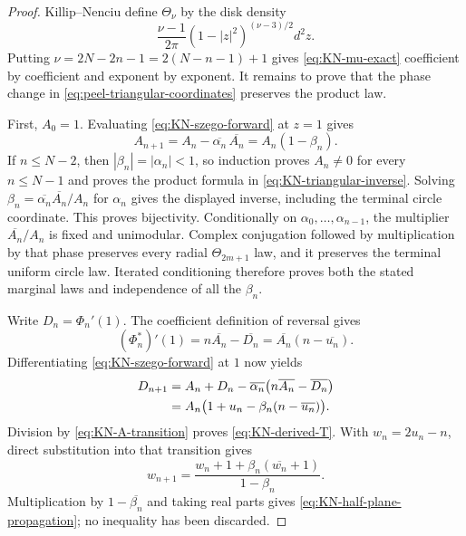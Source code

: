 \begin{proof}
Killip--Nenciu define $\Theta_\nu$ by the disk density
\begin{equation}
 \frac{\nu-1}{2\pi}(1-|z|^2)^{(\nu-3)/2}d^2z.
\end{equation}
Putting $\nu=2N-2n-1=2(N-n-1)+1$ gives \eqref{eq:KN-mu-exact}
coefficient by coefficient and exponent by exponent.  It remains to prove that the phase
change in \eqref{eq:peel-triangular-coordinates} preserves the product law.

First, $A_0=1$.  Evaluating \eqref{eq:KN-szego-forward} at $z=1$ gives
\begin{equation}
 A_{n+1}=A_n-\overline{\alpha_n}\,\overline{A_n}
 =A_n(1-\beta_n).
 \label{eq:KN-A-transition}
\end{equation}
If $n\leq N-2$, then $|\beta_n|=|\alpha_n|<1$, so induction proves $A_n\ne0$
for every $n\leq N-1$ and proves the product formula in
\eqref{eq:KN-triangular-inverse}.  Solving
$\beta_n=\overline{\alpha_n}\overline{A_n}/A_n$ for $\alpha_n$ gives the
displayed inverse, including the terminal circle coordinate.  This proves bijectivity.
Conditionally on $\alpha_0,\ldots,\alpha_{n-1}$, the multiplier
$\overline{A_n}/A_n$ is fixed and unimodular.  Complex conjugation followed by multiplication
by that phase preserves every radial $\Theta_{2m+1}$ law, and it preserves the terminal
uniform circle law.  Iterated conditioning therefore proves both the stated marginal laws
and independence of all the $\beta_n$.

Write $D_n=\Phi_n'(1)$.  The coefficient definition of reversal gives
\begin{equation}
 (\Phi_n^*)'(1)=n\overline{A_n}-\overline{D_n}
 =\overline{A_n}(n-\overline{u_n}).
 \label{eq:KN-star-derivative}
\end{equation}
Differentiating \eqref{eq:KN-szego-forward} at $1$ now yields
\begin{align}
 D_{n+1}
 &=A_n+D_n-\overline{\alpha_n}
   \bigl(n\overline{A_n}-\overline{D_n}\bigr)\notag\\
 &=A_n\bigl(1+u_n-\beta_n(n-\overline{u_n})\bigr).
 \label{eq:KN-D-transition}
\end{align}
Division by \eqref{eq:KN-A-transition} proves \eqref{eq:KN-derived-T}.
With $w_n=2u_n-n$, direct substitution into that transition gives
\begin{equation}
 w_{n+1}=\frac{w_n+1+\beta_n(\overline{w_n}+1)}{1-\beta_n}.
\end{equation}
Multiplication by $1-\overline{\beta_n}$ and taking real parts gives
\eqref{eq:KN-half-plane-propagation}; no inequality has been discarded.


\end{proof}
